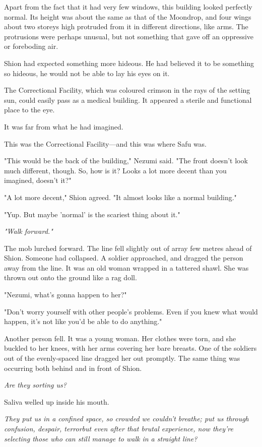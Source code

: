 Apart from the fact that it had very few windows, this building looked
perfectly normal. Its height was about the same as that of the Moondrop,
and four wings about two storeys high protruded from it in different
directions, like arms. The protrusions were perhaps unusual, but not
something that gave off an oppressive or foreboding air.

Shion had expected something more hideous. He had believed it to be
something so hideous, he would not be able to lay his eyes on it.

The Correctional Facility, which was coloured crimson in the rays of the
setting sun, could easily pass as a medical building. It appeared a
sterile and functional place to the eye.

It was far from what he had imagined.

This was the Correctional Facility---and this was where Safu was.

"This would be the back of the building," Nezumi said. "The front
doesn't look much different, though. So, how is it? Looks a lot more
decent than you imagined, doesn't it?"

"A lot more decent," Shion agreed. "It almost looks like a normal
building."

"Yup. But maybe 'normal' is the scariest thing about it."

\emph{"Walk forward."}

The mob lurched forward. The line fell slightly out of array few metres
ahead of Shion. Someone had collapsed. A soldier approached, and dragged
the person away from the line. It was an old woman wrapped in a tattered
shawl. She was thrown out onto the ground like a rag doll.

"Nezumi, what's gonna happen to her?"

"Don't worry yourself with other people's problems. Even if you knew
what would happen, it's not like you'd be able to do anything."

Another person fell. It was a young woman. Her clothes were torn, and
she buckled to her knees, with her arms covering her bare breasts. One
of the soldiers out of the evenly-spaced line dragged her out promptly.
The same thing was occurring both behind and in front of Shion.

\emph{Are they sorting us?}

Saliva welled up inside his mouth.

\emph{They put us in a confined space, so crowded we couldn't breathe;
put us through confusion, despair, terror\el but even after that brutal
experience, now they're selecting those who can still manage to walk in
a straight line?}

